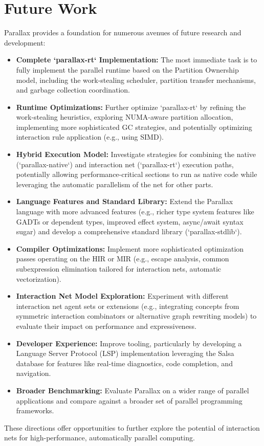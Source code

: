 \section{Future Work} %
Parallax provides a foundation for numerous avenues of future research and development:
\begin{itemize}
    \item \textbf{Complete `parallax-rt` Implementation:} The most immediate task is to fully implement the parallel runtime based on the Partition Ownership model, including the work-stealing scheduler, partition transfer mechanisms, and garbage collection coordination.
    \item \textbf{Runtime Optimizations:} Further optimize `parallax-rt` by refining the work-stealing heuristics, exploring NUMA-aware partition allocation, implementing more sophisticated GC strategies, and potentially optimizing interaction rule application (e.g., using SIMD).
    \item \textbf{Hybrid Execution Model:} Investigate strategies for combining the native (`parallax-native`) and interaction net (`parallax-rt`) execution paths, potentially allowing performance-critical sections to run as native code while leveraging the automatic parallelism of the net for other parts.
    \item \textbf{Language Features and Standard Library:} Extend the Parallax language with more advanced features (e.g., richer type system features like GADTs or dependent types, improved effect system, async/await syntax sugar) and develop a comprehensive standard library (`parallax-stdlib`).
    \item \textbf{Compiler Optimizations:} Implement more sophisticated optimization passes operating on the HIR or MIR (e.g., escape analysis, common subexpression elimination tailored for interaction nets, automatic vectorization).
    \item \textbf{Interaction Net Model Exploration:} Experiment with different interaction net agent sets or extensions (e.g., integrating concepts from symmetric interaction combinators or alternative graph rewriting models) to evaluate their impact on performance and expressiveness.
    \item \textbf{Developer Experience:} Improve tooling, particularly by developing a Language Server Protocol (LSP) implementation leveraging the Salsa database for features like real-time diagnostics, code completion, and navigation.
    \item \textbf{Broader Benchmarking:} Evaluate Parallax on a wider range of parallel applications and compare against a broader set of parallel programming frameworks.
\end{itemize}
These directions offer opportunities to further explore the potential of interaction nets for high-performance, automatically parallel computing. 